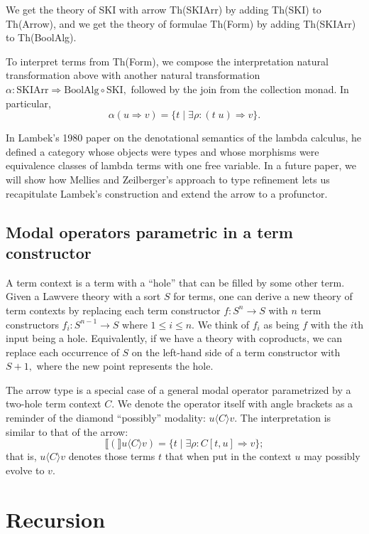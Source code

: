 \documentclass{article}
\newcommand{\interp}[1]{\llbracket #1 \rrbracket}
\newcommand{\maps}{\colon}
\newcommand{\lhom}{\Rightarrow}
\begin{document}
We get the theory of SKI with arrow Th(SKIArr) by adding Th(SKI) to Th(Arrow), and we get the theory of formulae Th(Form) by adding Th(SKIArr) to Th(BoolAlg).

To interpret terms from Th(Form), we compose the interpretation natural transformation above with another natural transformation $\alpha\maps \mathrm{SKIArr} \Rightarrow \mathrm{BoolAlg} \circ \mathrm{SKI},$ followed by the join from the collection monad.  In particular, 
\[ \alpha(u \lhom v) = \{ t \;|\; \exists \rho\maps (t\; u) \Rightarrow v \}. \]

In Lambek's 1980 paper on the denotational semantics of the lambda calculus, he defined a category whose objects were types and whose morphisms were equivalence classes of lambda terms with one free variable.  In a future paper, we will show how Mellies and Zeilberger's approach to type refinement lets us recapitulate Lambek's construction and extend the arrow to a profunctor.

\subsection{Modal operators parametric in a term constructor}

A term context is a term with a ``hole'' that can be filled by some other term.  Given a Lawvere theory with a sort $S$ for terms, one can derive a new theory of term contexts by replacing each term constructor $f\maps S^n \to S$ with $n$ term constructors $f_i\maps S^{n-1} \to S$ where $1 \le i \le n$.  We think of $f_i$ as being $f$ with the $i$th input being a hole.  Equivalently, if we have a theory with coproducts, we can replace each occurrence of $S$ on the left-hand side of a term constructor with $S+1,$ where the new point represents the hole.

The arrow type is a special case of a general modal operator parametrized by a two-hole term context $C.$  We denote the operator itself with angle brackets as a reminder of the diamond ``possibly'' modality: $u \langle C \rangle v.$  The interpretation is similar to that of the arrow:
\[ \interp(u \langle C\rangle v) = \{ t \;|\; \exists \rho\maps C[t, u] \Rightarrow v \}; \]
that is, $u \langle C\rangle v$ denotes those terms $t$ that when put in the context $u$ may possibly evolve to $v.$

\section{Recursion}
\end{document}
